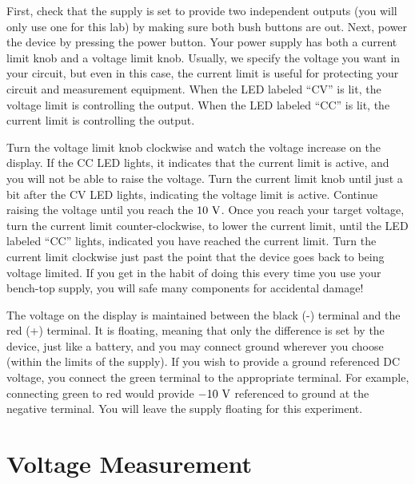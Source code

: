 First, check that the supply is set to provide two independent outputs
(you will only use one for this lab) by making sure both bush buttons
are out.  Next, power the device by pressing the power button.  Your
power supply has both a current limit knob and a voltage limit knob.
Usually, we specify the voltage you want in your circuit, but even in
this case, the current limit is useful for protecting your circuit and
measurement equipment.  When the LED labeled ``CV'' is lit, the
voltage limit is controlling the output.  When the LED labeled ``CC''
is lit, the current limit is controlling the output.

Turn the voltage limit knob clockwise and watch the voltage increase
on the display.  If the CC LED lights, it indicates that the current
limit is active, and you will not be able to raise the voltage.  Turn
the current limit knob until just a bit after the CV LED lights,
indicating the voltage limit is active.  Continue raising the voltage
until you reach the $10~\rm V$.  Once you reach your target voltage,
turn the current limit counter-clockwise, to lower the current limit,
until the LED labeled ``CC'' lights, indicated you have reached the
current limit.  Turn the current limit clockwise just past the point
that the device goes back to being voltage limited.  If you get in the
habit of doing this every time you use your bench-top supply, you will
safe many components for accidental damage!

The voltage on the display is maintained between the black (-)
terminal and the red (+) terminal.  It is floating, meaning that only
the difference is set by the device, just like a battery, and you may
connect ground wherever you choose (within the limits of the supply).
If you wish to provide a ground referenced DC voltage, you connect the
green terminal to the appropriate terminal.  For example, connecting
green to red would provide $-10~\rm V$ referenced to ground at the
negative terminal.  You will leave the supply floating for this
experiment.

\section{Voltage Measurement}

